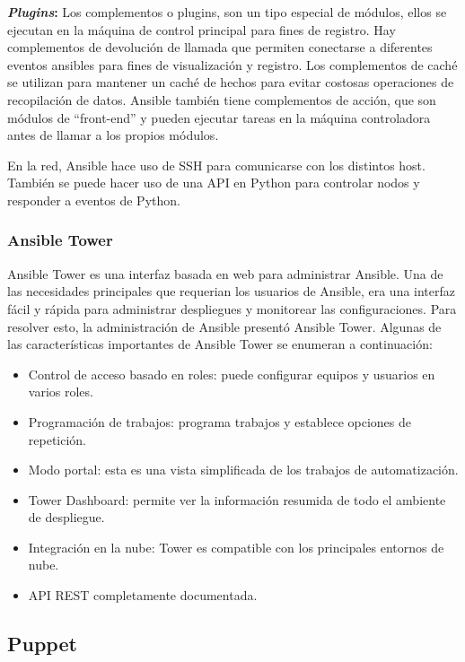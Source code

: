 \textbf{\textit{Plugins}:} Los complementos o plugins, son un tipo especial de módulos, ellos se ejecutan en la máquina de control principal para fines de registro. Hay complementos de devolución de llamada que permiten conectarse a diferentes eventos ansibles para fines de visualización y registro. Los complementos de caché se utilizan para mantener un caché de hechos para evitar costosas operaciones de recopilación de datos. Ansible también tiene complementos de acción, que son módulos de ``front-end'' y pueden ejecutar tareas en la máquina controladora antes de llamar a los propios módulos.\\

\par En la red, Ansible hace uso de SSH para comunicarse con los distintos host. También se puede hacer uso de una API en Python para controlar nodos y responder a eventos de Python.

\subsubsection{Ansible Tower}

\par Ansible Tower es una interfaz basada en web para administrar Ansible. Una de las necesidades principales que requerian los usuarios de Ansible, era una interfaz fácil y rápida para administrar despliegues y monitorear las configuraciones. Para resolver esto, la administración de Ansible  presentó  Ansible Tower. Algunas de las características importantes de Ansible Tower se enumeran a continuación:
\begin{itemize}
    \item Control de acceso basado en roles: puede configurar equipos y usuarios en varios roles.
    \item Programación de trabajos: programa trabajos y establece opciones de repetición.
    \item Modo portal: esta es una vista simplificada de los trabajos de automatización.
    \item Tower Dashboard: permite ver la información resumida de todo el ambiente de despliegue.
    \item Integración en la nube: Tower es compatible con los principales entornos de nube.
    \item API REST completamente documentada.
\end{itemize}


\subsection{Puppet}


